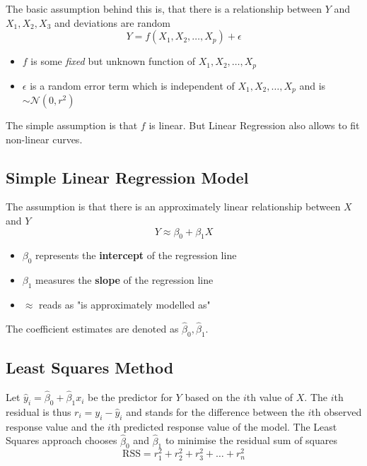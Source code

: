 \documentclass[11pt]{article}
\newcommand*\N[1]{\mathcal{N}\left(#1\right)}
\begin{document}
The basic assumption behind this is, that there is a relationship between $Y$ and $X_1, X_2, X_3$ and deviations are random
\begin{equation*}
	Y = f(X_1, X_2,\dots, X_p) + \epsilon
\end{equation*}
\begin{itemize}
	\item $f$ is some \emph{fixed} but unknown function of $X_1, X_2,\dots, X_p$
	\item $\epsilon$ is a random error term which is independent of $X_1, X_2,\dots, X_p$ and is $\sim\N{0,r^2}$
\end{itemize}
The simple assumption is that $f$ is linear. But Linear Regression also allows to fit non-linear curves.

\subsection{Simple Linear Regression Model}
The assumption is that there is an approximately linear relationship between $X$ and $Y$
\begin{equation*}
	Y \approx \beta_0 + \beta_1 X
\end{equation*}
\begin{itemize}[noitemsep]
	\item $\beta_0$ represents the \textbf{intercept} of the regression line
	\item $\beta_1$ measures the \textbf{slope} of the regression line
	\item $\approx$ reads as "is approximately modelled as"
\end{itemize}
The coefficient estimates are denoted as $\hat{\beta}_0, \hat{\beta}_1$.

\subsection{Least Squares Method}
Let $\hat{y}_i = \hat{\beta}_0 + \hat{\beta}_1 x_i$ be the predictor for $Y$ based on the $i$th value of $X$. The $i$th residual is thus $r_i = y_i - \hat{y}_i$ and stands for the difference between the $i$th observed response value and the $i$th predicted response value of the model. The Least Squares approach chooses $\hat{\beta}_0$ and $\hat{\beta}_1$ to minimise the residual sum of squares
\begin{equation*}
	\text{RSS} = r_1^2 + r_2^2 + r_3^2 + \dots + r_n^2
\end{equation*}
\end{document}
